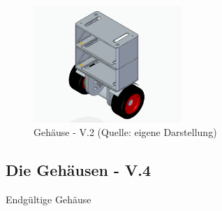 \begin{figure}[!h]  %
	\centering\includegraphics[width=0.5\textwidth]{images/gehaeuse-v3.png}
	\caption{Gehäuse - V.2 \newline (Quelle: eigene Darstellung)}
	\label{gehaeuse-v3} %
\end{figure}

\subsection{Die Gehäusen - V.4}

Endgültige Gehäuse 

